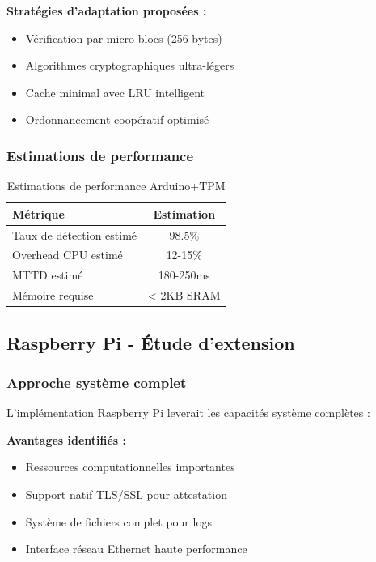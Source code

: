 \textbf{Stratégies d'adaptation proposées :}
\begin{itemize}
    \item Vérification par micro-blocs (256 bytes)
    \item Algorithmes cryptographiques ultra-légers
    \item Cache minimal avec LRU intelligent
    \item Ordonnancement coopératif optimisé
\end{itemize}

\subsubsection{Estimations de performance}

\begin{table}[h]
\centering
\caption{Estimations de performance Arduino+TPM}
\label{tab:arduino-estimates}
\begin{tabular}{|l|c|}
\hline
\textbf{Métrique} & \textbf{Estimation} \\
\hline
Taux de détection estimé & 98.5\% \\
Overhead CPU estimé & 12-15\% \\
MTTD estimé & 180-250ms \\
Mémoire requise & < 2KB SRAM \\
\hline
\end{tabular}
\end{table}

\subsection{Raspberry Pi - Étude d'extension}

\subsubsection{Approche système complet}

L'implémentation Raspberry Pi leverait les capacités système complètes :

\textbf{Avantages identifiés :}
\begin{itemize}
    \item Ressources computationnelles importantes
    \item Support natif TLS/SSL pour attestation
    \item Système de fichiers complet pour logs
    \item Interface réseau Ethernet haute performance
\end{itemize}

